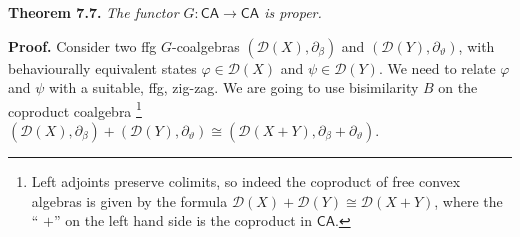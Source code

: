 \documentclass[11pt,a4paper]{amsart}
\begin{document}
\par\medskip
\hypertarget{html:S7.Thmtheorem7}{} \par\noindent\textbf{\textbf{Theorem 7.7}\textbf{.}}\quad  %
\hypertarget{html:S7.Thmtheorem7.p1}{} \emph{The functor %
\hypertarget{html:S7.Thmtheorem7.p1.m1}{}\({G:\mathsf{CA}\to\mathsf{CA}}\) is proper.}
\par\medskip
\hypertarget{html:S7.SS0.SSS0.P0.SPx4}{} \par\noindent\textbf{Proof.}\quad  %
\hypertarget{html:S7.SS0.SSS0.P0.SPx4.p1}{} Consider two ffg %
\hypertarget{html:S7.SS0.SSS0.P0.SPx4.p1.m1}{}\({G}\)-coalgebras %
\hypertarget{html:S7.SS0.SSS0.P0.SPx4.p1.m2}{}\({({\mathcal{D}}(X),\partial_{\beta})}\) and %
\hypertarget{html:S7.SS0.SSS0.P0.SPx4.p1.m3}{}\({({\mathcal{D}}(Y),\partial_{\vartheta})}\), with behaviourally equivalent states %
\hypertarget{html:S7.SS0.SSS0.P0.SPx4.p1.m4}{}\({\varphi\in{\mathcal{D}}(X)}\) and %
\hypertarget{html:S7.SS0.SSS0.P0.SPx4.p1.m5}{}\({\psi\in{\mathcal{D}}(Y)}\). We need to relate %
\hypertarget{html:S7.SS0.SSS0.P0.SPx4.p1.m6}{}\({\varphi}\) and %
\hypertarget{html:S7.SS0.SSS0.P0.SPx4.p1.m7}{}\({\psi}\) with a suitable, ffg, zig-zag. We are going to use bisimilarity %
\hypertarget{html:S7.SS0.SSS0.P0.SPx4.p1.m8}{}\({B}\) on the coproduct coalgebra%
\hypertarget{html:footnote2}{}\footnote{Left adjoints preserve colimits, so indeed the coproduct of free convex algebras is given by the formula %
\hypertarget{html:footnote2.m1}{}\({{\mathcal{D}}(X)+{\mathcal{D}}(Y)\cong{\mathcal{D}}(X+Y)}\), where the “%
\hypertarget{html:footnote2.m2}{}\({+}\)” on the left hand side is the coproduct in %
\hypertarget{html:footnote2.m3}{}\({\mathsf{CA}}\).} %
\hypertarget{html:S7.SS0.SSS0.P0.SPx4.p1.m9}{}\({({\mathcal{D}}(X),\partial_{\beta})+({\mathcal{D}}(Y),\partial_{\vartheta})\cong({\mathcal{D}}(X+Y),\partial_{\beta}+\partial_{\vartheta})}\).
\par\medskip
\end{document}
